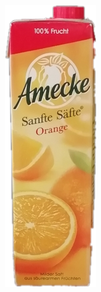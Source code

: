 \documentclass[a4paper,12pt,oneside]{article}
\begin{document}
\begin{figure}[htb]
\begin{minipage}[c]{0.08\textwidth}
\includegraphics[width=\textwidth]{Sources/Bild2.png}

\end{minipage}
\end{figure}
\end{document}
